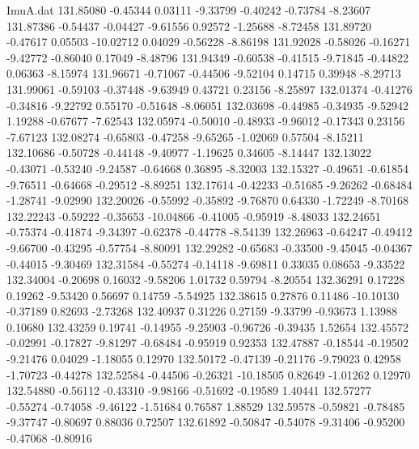 \begin{filecontents}{ImuA.dat}
 131.85080   -0.45344    0.03111   -9.33799   -0.40242   -0.73784   -8.23607
 131.87386   -0.54437   -0.04427   -9.61556    0.92572   -1.25688   -8.72458
 131.89720   -0.47617    0.05503  -10.02712    0.04029   -0.56228   -8.86198
 131.92028   -0.58026   -0.16271   -9.42772   -0.86040    0.17049   -8.48796
 131.94349   -0.60538   -0.41515   -9.71845   -0.44822    0.06363   -8.15974
 131.96671   -0.71067   -0.44506   -9.52104    0.14715    0.39948   -8.29713
 131.99061   -0.59103   -0.37448   -9.63949    0.43721    0.23156   -8.25897
 132.01374   -0.41276   -0.34816   -9.22792    0.55170   -0.51648   -8.06051
 132.03698   -0.44985   -0.34935   -9.52942    1.19288   -0.67677   -7.62543
 132.05974   -0.50010   -0.48933   -9.96012   -0.17343    0.23156   -7.67123
 132.08274   -0.65803   -0.47258   -9.65265   -1.02069    0.57504   -8.15211
 132.10686   -0.50728   -0.44148   -9.40977   -1.19625    0.34605   -8.14447
 132.13022   -0.43071   -0.53240   -9.24587   -0.64668    0.36895   -8.32003
 132.15327   -0.49651   -0.61854   -9.76511   -0.64668   -0.29512   -8.89251
 132.17614   -0.42233   -0.51685   -9.26262   -0.68484   -1.28741   -9.02990
 132.20026   -0.55992   -0.35892   -9.76870    0.64330   -1.72249   -8.70168
 132.22243   -0.59222   -0.35653  -10.04866   -0.41005   -0.95919   -8.48033
 132.24651   -0.75374   -0.41874   -9.34397   -0.62378   -0.44778   -8.54139
 132.26963   -0.64247   -0.49412   -9.66700   -0.43295   -0.57754   -8.80091
 132.29282   -0.65683   -0.33500   -9.45045   -0.04367   -0.44015   -9.30469
 132.31584   -0.55274   -0.14118   -9.69811    0.33035    0.08653   -9.33522
 132.34004   -0.20698    0.16032   -9.58206    1.01732    0.59794   -8.20554
 132.36291    0.17228    0.19262   -9.53420    0.56697    0.14759   -5.54925
 132.38615    0.27876    0.11486  -10.10130   -0.37189    0.82693   -2.73268
 132.40937    0.31226    0.27159   -9.33799   -0.93673    1.13988    0.10680
 132.43259    0.19741   -0.14955   -9.25903   -0.96726   -0.39435    1.52654
 132.45572   -0.02991   -0.17827   -9.81297   -0.68484   -0.95919    0.92353
 132.47887   -0.18544   -0.19502   -9.21476    0.04029   -1.18055    0.12970
 132.50172   -0.47139   -0.21176   -9.79023    0.42958   -1.70723   -0.44278
 132.52584   -0.44506   -0.26321  -10.18505    0.82649   -1.01262    0.12970
 132.54880   -0.56112   -0.43310   -9.98166   -0.51692   -0.19589    1.40441
 132.57277   -0.55274   -0.74058   -9.46122   -1.51684    0.76587    1.88529
 132.59578   -0.59821   -0.78485   -9.37747   -0.80697    0.88036    0.72507
 132.61892   -0.50847   -0.54078   -9.31406   -0.95200   -0.47068   -0.80916

\end{filecontents}
